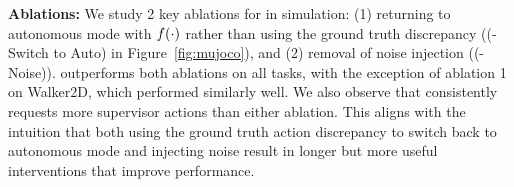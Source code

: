 \textbf{Ablations: } We study 2 key ablations for \algname in simulation: (1) returning to autonomous mode with $f(\cdot)$ rather than using the ground truth discrepancy (\algname (-Switch to Auto) in Figure~\ref{fig:mujoco}), and (2) removal of noise injection (\algname (-Noise)). \algabbr outperforms both ablations on all tasks, with the exception of ablation 1 on Walker2D, which performed similarly well. We also observe that \algabbr consistently requests more supervisor actions than either ablation. This aligns with the intuition that both using the ground truth action discrepancy to switch back to autonomous mode and injecting noise result in longer but more useful interventions that improve performance. 




